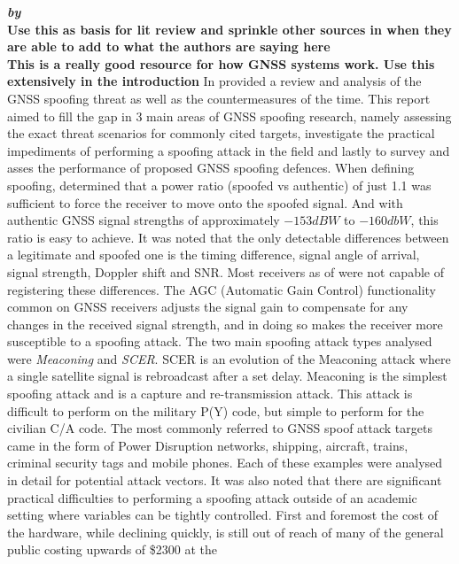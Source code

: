 \medskip

\textbf{\emph{ by \citeauthor{RN32}}} \\
\textbf{Use this as basis for lit review and sprinkle other sources in when they are able to add to what the authors are saying here} \\
\textbf{This is a really good resource for how GNSS systems work. Use this extensively in the introduction}
In \citeyear{RN32} \citeauthor{RN32} \cite{RN32} provided a review and analysis of the GNSS spoofing threat as well as the countermeasures of the time. This report aimed
to fill the gap in 3 main areas of GNSS spoofing research, namely assessing the exact threat scenarios for commonly cited targets, investigate the practical impediments
of performing a spoofing attack in the field and lastly to survey and asses the performance of proposed GNSS spoofing defences. When defining spoofing, \citeauthor{RN32}
determined that a power ratio (spoofed vs authentic) of just 1.1 was sufficient to force the receiver to move onto the spoofed signal. And with authentic GNSS signal
strengths of approximately $-153dBW$ to $-160dbW$, this ratio is easy to achieve.  It was noted that the
only detectable differences between a legitimate and spoofed one is the timing difference, signal angle of arrival, signal strength, Doppler shift and SNR. Most receivers
as of \citeyear{RN32} were not capable of registering these differences. The AGC (Automatic Gain Control) functionality common on GNSS receivers adjusts the signal gain
to compensate for any changes in the received signal strength, and in doing so makes the receiver more susceptible to a spoofing attack. The two main spoofing attack
types analysed were \emph{Meaconing} and \emph{SCER}. SCER is an evolution of the Meaconing attack where a single satellite signal is rebroadcast after a set delay.
Meaconing is the simplest spoofing attack and is a capture and re-transmission attack. This attack is difficult to perform on the military P(Y) code, but simple to perform
for the civilian C/A code. The most commonly referred to GNSS spoof attack targets came in the form of Power Disruption networks, shipping, aircraft, trains, criminal
security tags and mobile phones. Each of these examples were analysed in detail for potential attack vectors.
It was also noted that there are significant practical difficulties to performing a spoofing attack outside of an academic setting where variables can be tightly
controlled. First and foremost the cost of the hardware, while declining quickly, is still out of reach of many of the general public costing upwards of \$2300 at the
